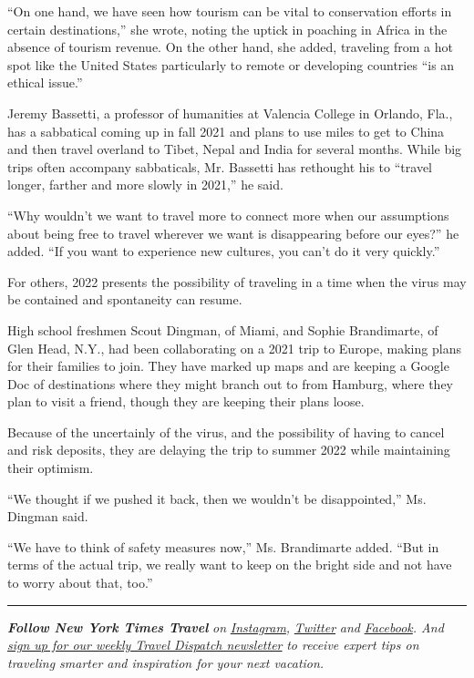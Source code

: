 ``On one hand, we have seen how tourism can be vital to conservation
efforts in certain destinations,'' she wrote, noting the uptick in
poaching in Africa in the absence of tourism revenue. On the other hand,
she added, traveling from a hot spot like the United States particularly
to remote or developing countries ``is an ethical issue.''

Jeremy Bassetti, a professor of humanities at Valencia College in
Orlando, Fla., has a sabbatical coming up in fall 2021 and plans to use
miles to get to China and then travel overland to Tibet, Nepal and India
for several months. While big trips often accompany sabbaticals, Mr.
Bassetti has rethought his to ``travel longer, farther and more slowly
in 2021,'' he said.

``Why wouldn't we want to travel more to connect more when our
assumptions about being free to travel wherever we want is disappearing
before our eyes?'' he added. ``If you want to experience new cultures,
you can't do it very quickly.''

For others, 2022 presents the possibility of traveling in a time when
the virus may be contained and spontaneity can resume.

High school freshmen Scout Dingman, of Miami, and Sophie Brandimarte, of
Glen Head, N.Y., had been collaborating on a 2021 trip to Europe, making
plans for their families to join. They have marked up maps and are
keeping a Google Doc of destinations where they might branch out to from
Hamburg, where they plan to visit a friend, though they are keeping
their plans loose.

Because of the uncertainly of the virus, and the possibility of having
to cancel and risk deposits, they are delaying the trip to summer 2022
while maintaining their optimism.

``We thought if we pushed it back, then we wouldn't be disappointed,''
Ms. Dingman said.

``We have to think of safety measures now,'' Ms. Brandimarte added.
``But in terms of the actual trip, we really want to keep on the bright
side and not have to worry about that, too.''

\begin{center}\rule{0.5\linewidth}{\linethickness}\end{center}

\emph{\textbf{Follow New York Times Travel}} \emph{on}
\href{https://www.instagram.com/nytimestravel/}{\emph{Instagram}}\emph{,}
\href{https://twitter.com/nytimestravel}{\emph{Twitter}} \emph{and}
\href{https://www.facebook.com/nytimestravel/}{\emph{Facebook}}\emph{.
And}
\href{https://www.nytimes.com/newsletters/traveldispatch}{\emph{sign up
for our weekly Travel Dispatch newsletter}} \emph{to receive expert tips
on traveling smarter and inspiration for your next vacation.}

